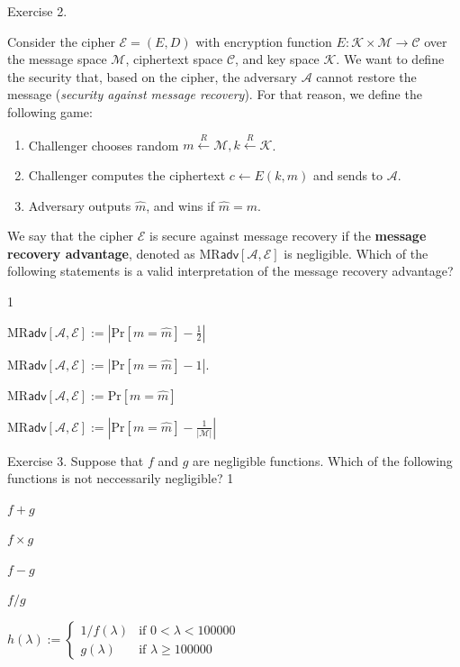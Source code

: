 \documentclass[../lecture-notes-148x210.tex]{subfiles}
\begin{document}
\begin{xexercise}
    {Exercise 2.}
    {
        Consider the cipher $\mathcal{E} = (E,D)$ with encryption function $E: \mathcal{K} \times \mathcal{M} \to \mathcal{C}$ 
        over the message space $\mathcal{M}$, ciphertext space $\mathcal{C}$, and key space $\mathcal{K}$. We want to 
        define the security that, based on the cipher, the adversary $\mathcal{A}$ cannot restore the message 
        (\textit{security against message recovery}). For that reason, we define the following game:
        \begin{enumerate}
            \item Challenger chooses random $m \xleftarrow{R} \mathcal{M}, k \xleftarrow{R} \mathcal{K}$.
            \item Challenger computes the ciphertext $c \gets E(k,m)$ and sends to $\mathcal{A}$.
            \item Adversary outputs $\hat{m}$, and wins if $\hat{m} = m$.
        \end{enumerate}

        We say that the cipher $\mathcal{E}$ is secure against message recovery if the \textbf{message recovery advantage}, denoted as $\text{MR}\textsf{adv}[\mathcal{A}, \mathcal{E}]$ is negligible. Which of the following statements is a valid interpretation of the message recovery advantage?
    }
    {1}
    {
        \item $\text{MR}\textsf{adv}[\mathcal{A},\mathcal{E}] := \left|\text{Pr}[m=\hat{m}] - \frac{1}{2}\right|$
        \item $\text{MR}\textsf{adv}[\mathcal{A},\mathcal{E}] := \left|\text{Pr}[m=\hat{m}] - 1\right|$.
        \item $\text{MR}\textsf{adv}[\mathcal{A},\mathcal{E}] := \text{Pr}[m=\hat{m}]$
        \item $\text{MR}\textsf{adv}[\mathcal{A},\mathcal{E}] := \left|\text{Pr}[m=\hat{m}] - \frac{1}{|\mathcal{M}|}\right|$    
    }
\end{xexercise}

\begin{xexercise}
    {Exercise 3.}
    {Suppose that $f$ and $g$ are negligible functions. Which of the following functions is not neccessarily negligible?}
    {1}
    {
        \item $f + g$
        \item $f \times g$
        \item $f - g$
        \item $f/g$
        \item $h(\lambda) := \begin{cases}
            1/f(\lambda) & \text{if } 0 < \lambda < 100000 \\
            g(\lambda) & \text{if } \lambda \geq 100000
        \end{cases}$
    }
\end{xexercise}
\end{document}

